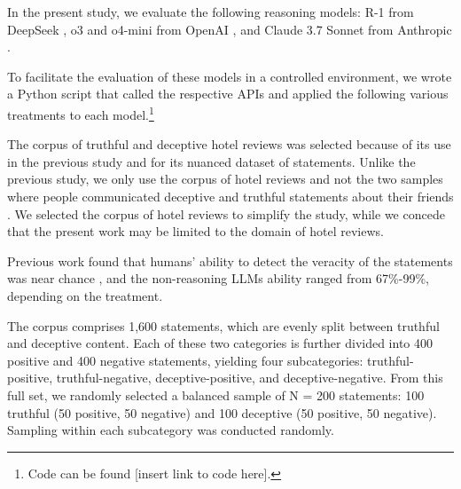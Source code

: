 \documentclass{article}
\begin{document}

In the present study, we evaluate the following reasoning models: R-1 from DeepSeek \citep{deepseek-ai_deepseek-r1_2025}, o3 and o4-mini from OpenAI \citep{openai_openai_2024}, and Claude 3.7 Sonnet from Anthropic \citep{anthropic_claude_2025}.

To facilitate the evaluation of these models in a controlled environment, we wrote a Python script that called the respective APIs and applied the following various treatments to each model.\footnote{Code can be found [insert link to code here].} %

The corpus of truthful and deceptive hotel reviews \citep{ott_finding_2011} was selected because of its use in the previous study \citep{markowitz_generative_2024} and for its nuanced dataset of statements. Unlike the previous study, we only use the corpus of hotel reviews \citep{ott_finding_2011} and not the two samples where people communicated deceptive and truthful statements about their friends \citep{markowitz_when_2020, lloyd_miami_2019}. We selected the corpus of hotel reviews to simplify the study, while we concede that the present work may be limited to the domain of hotel reviews.

Previous work \citep{markowitz_generative_2024} found that humans' ability to detect the veracity of the statements was near chance \citep{markowitz_generative_2024}, and the non-reasoning LLMs ability ranged from 67\%-99\%, depending on the treatment.

The corpus comprises 1,600 statements, which are evenly split between truthful and deceptive content. Each of these two categories is further divided into 400 positive and 400 negative statements, yielding four subcategories: truthful-positive, truthful-negative, deceptive-positive, and deceptive-negative. From this full set, we randomly selected a balanced sample of N = 200 statements: 100 truthful (50 positive, 50 negative) and 100 deceptive (50 positive, 50 negative). Sampling within each subcategory was conducted randomly.

\end{document}
